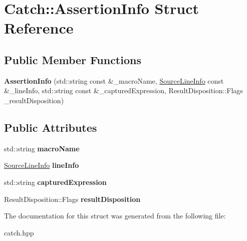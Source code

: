 \hypertarget{structCatch_1_1AssertionInfo}{}\section{Catch\+:\+:Assertion\+Info Struct Reference}
\label{structCatch_1_1AssertionInfo}
\subsection*{Public Member Functions}
\begin{DoxyCompactItemize}
\item 
{\bfseries Assertion\+Info} (std\+::string const \&\+\_\+macro\+Name, \hyperlink{structCatch_1_1SourceLineInfo}{Source\+Line\+Info} const \&\+\_\+line\+Info, std\+::string const \&\+\_\+captured\+Expression, Result\+Disposition\+::\+Flags \+\_\+result\+Disposition)\hypertarget{structCatch_1_1AssertionInfo_aaf6cc3eebd40391e54d37ed42953c73f}{}\label{structCatch_1_1AssertionInfo_aaf6cc3eebd40391e54d37ed42953c73f}

\end{DoxyCompactItemize}
\subsection*{Public Attributes}
\begin{DoxyCompactItemize}
\item 
std\+::string {\bfseries macro\+Name}\hypertarget{structCatch_1_1AssertionInfo_ac2e59e8c89e00eb3390768f50d540b18}{}\label{structCatch_1_1AssertionInfo_ac2e59e8c89e00eb3390768f50d540b18}

\item 
\hyperlink{structCatch_1_1SourceLineInfo}{Source\+Line\+Info} {\bfseries line\+Info}\hypertarget{structCatch_1_1AssertionInfo_a17bdbb404ba12658034f833be2f4c3e7}{}\label{structCatch_1_1AssertionInfo_a17bdbb404ba12658034f833be2f4c3e7}

\item 
std\+::string {\bfseries captured\+Expression}\hypertarget{structCatch_1_1AssertionInfo_af7c1d3cbfa346e9a303030fa0ef0cb54}{}\label{structCatch_1_1AssertionInfo_af7c1d3cbfa346e9a303030fa0ef0cb54}

\item 
Result\+Disposition\+::\+Flags {\bfseries result\+Disposition}\hypertarget{structCatch_1_1AssertionInfo_a60353b3632ab2f827162f2b2d6911073}{}\label{structCatch_1_1AssertionInfo_a60353b3632ab2f827162f2b2d6911073}

\end{DoxyCompactItemize}


The documentation for this struct was generated from the following file\+:\begin{DoxyCompactItemize}
\item 
catch.\+hpp\end{DoxyCompactItemize}
